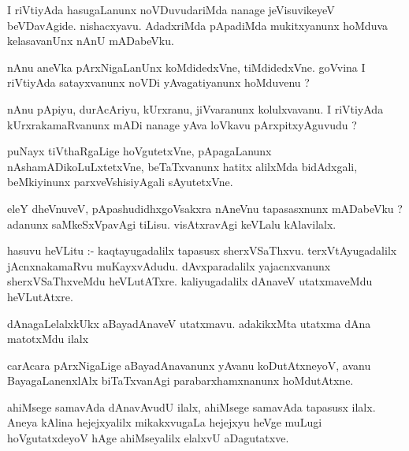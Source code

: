 \documentclass{article}
\begin{document}
\begin{mn}
I riVtiyAda  hasugaLanunx  noVDuvudariMda  nanage  jeVisuvikeyeV  beVDavAgide.  
nishacxyavu.  AdadxriMda  pApadiMda  mukitxyanunx  hoMduva  kelasavanUnx  nAnU  mADabeVku.
\end{mn}

\begin{mn}
nAnu  aneVka  pArxNigaLanUnx  koMdidedxVne,  tiMdidedxVne.  goVvina  I riVtiyAda  
satayxvanunx  noVDi  yAvagatiyanunx  hoMduvenu ?
\end{mn}

\begin{mn}
nAnu  pApiyu,  durAcAriyu,  kUrxranu,  jiVvaranunx  kolulxvavanu.  I  riVtiyAda  
kUrxrakamaRvanunx  mADi  nanage  yAva  loVkavu  pArxpitxyAguvudu ?
\end{mn}

\begin{mn}
puNayx tiVthaRgaLige  hoVgutetxVne,  pApagaLanunx  nAshamADikoLuLxtetxVne,  
beTaTxvanunx  hatitx  alilxMda  bidAdxgali,  beMkiyinunx  parxveVshisiyAgali  sAyutetxVne.
\end{mn}

\begin{mn}
eleY  dheVnuveV,  pApashudidhxgoVsakxra  nAneVnu  tapasasxnunx  mADabeVku ?  
adanunx  saMkeSxVpavAgi  tiLisu.  visAtxravAgi  keVLalu  kAlavilalx.
\end{mn}

\begin{mn}
hasuvu  heVLitu :- kaqtayugadalilx  tapasusx  sherxVSaThxvu.  terxVtAyugadalilx  
jAcnxnakamaRvu  muKayxvAdudu.  dAvxparadalilx  yajacnxvanunx  sherxVSaThxveMdu  
heVLutATxre.  kaliyugadalilx  dAnaveV  utatxmaveMdu  heVLutAtxre.
\end{mn}

\begin{mn}
dAnagaLelalxkUkx  aBayadAnaveV  utatxmavu.  adakikxMta  utatxma  dAna  matotxMdu  ilalx
\end{mn}

\begin{mn}
carAcara  pArxNigaLige  aBayadAnavanunx  yAvanu  koDutAtxneyoV,  avanu  
BayagaLanenxlAlx  biTaTxvanAgi  parabarxhamxnanunx  hoMdutAtxne.
\end{mn}

\begin{mn}
ahiMsege  samavAda  dAnavAvudU  ilalx,  ahiMsege  samavAda  tapasusx  
ilalx.  Aneya  kAlina  hejejxyalilx  mikakxvugaLa  hejejxyu  heVge  
muLugi hoVgutatxdeyoV  hAge  ahiMseyalilx  elalxvU  aDagutatxve.  
\end{mn}
\end{document}
